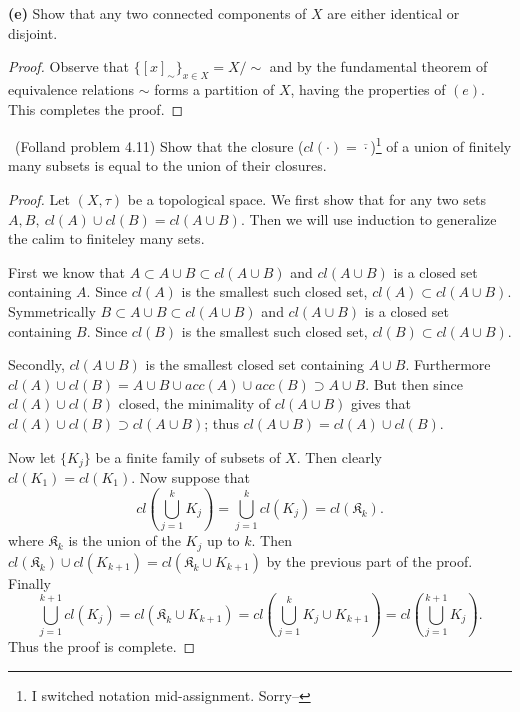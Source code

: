 \documentclass[11pt]{amsart}
\theoremstyle{definition}
\numberwithin{theorem}{section}
\numberwithin{definition}{section}
\numberwithin{equation}{section}
\begin{document}
\noindent \textbf{(e)} Show that any two connected components of $X$ are either identical or disjoint.
\begin{proof}
	Observe that $\{[x]_\sim\}_{x\in X} = X/\sim$ and by the fundamental theorem of equivalence relations $\sim$ forms a partition of $X$, having the properties of $(e).$ This completes the proof.
\end{proof}
\medskip {}\ (Folland problem 4.11) Show that the closure ($cl(\cdot) = \overline{\cdot}$)\footnote{I switched notation mid-assignment. Sorry--} of a union of finitely many subsets is equal to the union of their closures. \\
\begin{proof}
	Let $(X, \tau)$ be a topological space. We first show that for any two sets $A,B,\  cl(A) \cup cl(B) = cl(A \cup B)$. Then we will use induction to generalize the calim to finiteley many sets.

	First we know that $A \subset A \cup B \subset cl(A \cup B)$ and $cl(A \cup B)$ is a closed set containing $A$. Since $cl(A)$ is the smallest such closed set, $cl(A) \subset cl(A \cup B).$  Symmetrically $B \subset A \cup B \subset cl(A \cup B)$ and $cl(A\cup B)$ is a closed set containing $B$. Since $cl(B)$ is the smallest such closed set, $cl(B) \subset cl(A \cup B).$

	Secondly, $cl(A \cup B)$ is the smallest closed set containing $A \cup B$. Furthermore $cl(A) \cup cl(B) = A \cup B \cup acc(A) \cup acc(B) \supset A \cup B$. But then since $cl(A) \cup cl(B)$ closed, the minimality of $cl(A \cup B)$ gives that $cl(A) \cup cl(B) \supset cl(A \cup B)$;
	thus $cl(A \cup B) = cl(A) \cup cl(B).$

	Now let $\{K_j\}$ be a finite family of subsets of $X$. Then clearly $cl(K_1) = cl(K_1).$ Now suppose that 
	\begin{equation*}
		cl\left(\bigcup_{j=1}^k K_j\right) = \bigcup_{j=1}^k cl(K_j) = cl(\mathfrak{K}_k).
	\end{equation*}
	where $\mathfrak{K}_k$ is the union of the $K_j$ up to $k$.
	Then $cl({\mathfrak{K}_k}) \cup cl(K_{k+1}) = cl({\mathfrak{K}_k} \cup K_{k+1})$ by the previous part of the proof. Finally 
	\begin{equation*}
		\bigcup_{j=1}^{k+1} cl(K_j) = cl({\mathfrak{K}_k} \cup K_{k+1}) = cl\left(\bigcup_{j=1}^k K_j  \cup K_{k+1}\right) = cl\left(\bigcup_{j=1}^{k+1} K_j \right).
	\end{equation*}
	Thus the proof is complete.
\end{proof}
\end{document}
